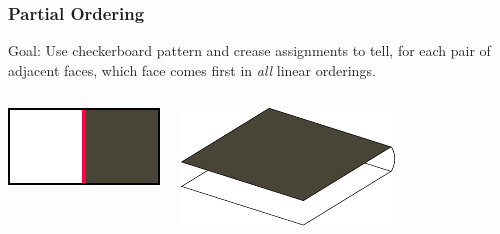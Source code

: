 \documentclass{beamer}
\begin{document}
\begin{frame}
\frametitle{Partial Ordering}
\begin{block}{Goal:}
Use checkerboard pattern and crease assignments to tell, for each pair of adjacent faces, which face comes first in \textit{all} linear orderings.
\end{block}

\bigskip

\begin{columns}[c]
\includegraphics[width=\textwidth]{sam_images/cboard-valley-tile.pdf}

\pause

\includegraphics[width=.9\textwidth]{sam_images/checkerboard-3a.pdf}

\end{columns}

\end{frame}

\end{document}
